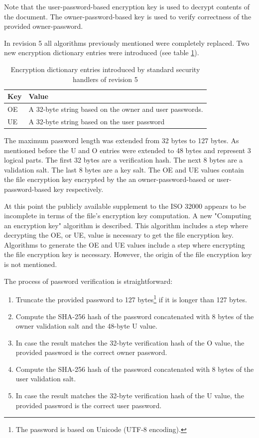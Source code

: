 \documentclass[11pt,oneside]{fithesis2}
\begin{document}
Note that the user-password-based encryption key is used to decrypt contents of the document. The owner-password-based key is used to verify correctness of the provided owner-password.

In revision 5 all algorithms previously mentioned were completely replaced. Two new encryption dictionary entries were introduced (see table \ref{additional_handler_entries}). 

\begin{table}[h]
	\centering
	\begin{tabular}{|l|l|}
               \hline
		\textbf{Key}&\textbf{Value}\\
	\hline
		OE&A 32-byte string based on the owner and user passwords.\\
		UE&A 32-byte string based on the user password\\
	\hline
           \end{tabular}
	\caption{Encryption dictionary entries introduced by standard security handlers of revision 5}
	\label{additional_handler_entries}
\end{table}

The maximum password length was extended from 32 bytes to 127 bytes. As mentioned before the U and O entries were extended to 48 bytes and represent 3 logical parts. The first 32 bytes are a verification hash. The next 8 bytes are a validation salt. The last 8 bytes are a key salt. The OE and UE values contain the file encryption key encrypted by the an owner-password-based or user-password-based key respectively.

At this point the publicly available supplement to the ISO 32000 \cite{iso32000sup} appears to be incomplete in terms of the file's encryption key computation. A new "Computing an encryption key" algorithm is described. This algorithm includes a step where decrypting the OE, or UE, value is necessary to get the file encryption key. Algorithms to generate the OE and UE values include a step where encrypting the file encryption key is necessary. However, the origin of the file encryption key is not mentioned. 

The process of password verification is straightforward:

\begin{enumerate}
\setlength\itemsep{0.1em}
\item{Truncate the provided password to 127 bytes\footnote{The password is based on Unicode (UTF-8 encoding).} if it is longer than 127 bytes.}
\item{Compute the SHA-256 hash of the password concatenated with 8 bytes of the owner validation salt and the 48-byte U value.}
\item{In case the result matches the 32-byte verification hash of the O value, the provided password is the correct owner password.}
\item{Compute the SHA-256 hash of the password concatenated with 8 bytes of the user validation salt.}
\item{In case the result matches the 32-byte verification hash of the U value, the provided password is the correct user password.}
\end{enumerate}
\end{document}
